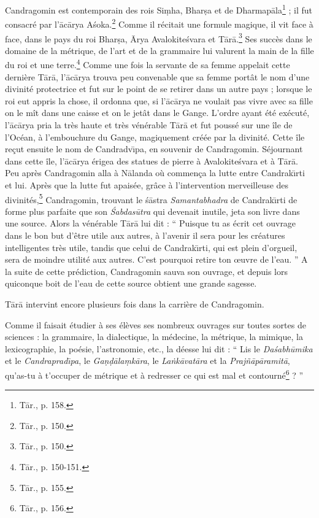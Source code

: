 \documentclass[a4paper, 11pt, oneside, french]{article}
\begin{document}
Candragomin est contemporain des rois Si\d{m}ha, Bhar\d{s}a et de Dharmap\={a}la\footnote{T\={a}r., p. 158.} ; il fut consacré par l'\={a}c\={a}rya A\'{s}oka.\footnote{T\={a}r., p. 150.} Comme il récitait une formule magique, il vit face à face, dans le pays du roi Bhar\d{s}a, \={A}rya Avalokite\'{s}vara et T\={a}r\={a}.\footnote{T\={a}r., p. 150.} Ses succès dans le domaine de la métrique, de l'art et de la grammaire lui valurent la main de la fille du roi et une terre.\footnote{T\={a}r., p. 150-151.} Comme une fois la servante de sa femme appelait cette dernière T\={a}r\={a}, l'\={a}c\={a}rya trouva peu convenable que sa femme portât le nom d'une divinité protectrice et fut sur le point de se retirer dans un autre pays ; lorsque le roi eut appris la chose, il ordonna que, si l'\={a}c\={a}rya ne voulait pas vivre avec sa fille on le mît dans une caisse et on le jetât dans le Gange. L'ordre ayant été exécuté, l'\={a}c\={a}rya pria la très haute et très vénérable T\={a}r\={a} et fut poussé sur une île de l'Océan, à l'embouchure du Gange, magiquement créée par la divinité. Cette île reçut ensuite le nom de Candradv\={\i}pa, en souvenir de Candragomin. Séjournant dans cette île, l'\={a}c\={a}rya érigea des statues de pierre à Avalokite\'{s}vara et à T\={a}r\={a}. Peu après Candragomin alla à N\={a}landa où commença la lutte entre Candrak\={\i}rti et lui. Après que la lutte fut apaisée, grâce à l'intervention merveilleuse des divinités,\footnote{T\={a}r., p. 155.} Candragomin, trouvant le \'{s}\={a}stra \emph{Samantabhadra} de Candrak\={\i}rti de forme plus parfaite que son \emph{\'{S}abdas\={u}tra} qui devenait inutile, jeta son livre dans une source. Alors la vénérable T\={a}r\={a} lui dit : `` Puisque tu as écrit cet ouvrage dans le bon but d'être utile aux autres, à l'avenir il sera pour les créatures intelligentes très utile, tandis que celui de Candrak\={\i}rti, qui est plein d'orgueil, sera de moindre utilité aux autres. C'est pourquoi retire ton œuvre de l'eau. '' A la suite de cette prédiction, Candragomin sauva son ouvrage, et depuis lors quiconque boit de l'eau de cette source obtient une grande sagesse.

T\={a}r\={a} intervint encore plusieurs fois dans la carrière de Candragomin.

Comme il faisait étudier à ses élèves ses nombreux ouvrages sur toutes sortes de sciences : la grammaire, la dialectique, la médecine, la métrique, la mimique, la lexicographie, la poésie, l'astronomie, etc., la déesse lui dit : `` Lis le \emph{Da\'{s}abh\={u}mika} et le \emph{Candraprad\={\i}pa}, le \emph{Ga\d{n}\d{d}\={a}la\d{m}k\={a}ra}, le \emph{La\.{n}k\={a}vat\={a}ra} et la \emph{Praj\~{n}\={a}p\={a}ramit\={a}}, qu'as-tu à t'occuper de métrique et à redresser ce qui est mal et contourné\footnote{T\={a}r., p. 156.} ? ''
\end{document}
